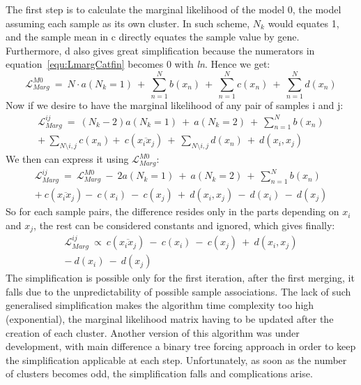 \documentclass[twocolumn]{article}
\begin{document}
The first step is to calculate the marginal likelihood of the model 0, the model assuming each sample as its own cluster. In such scheme, $N_k$ would equates 1, and the sample mean in c directly equates the sample value by gene. Furthermore, d also gives great simplification because the numerators in equation~\ref{equ:LmargCatfin} becomes 0 with \emph{ln}.
Hence we get:
\begin{equation}
    \mathcal{L}_{Marg}^{M0}\ =\ N\cdotp a(N_k=1)\ +\ \sum_{n=1}^Nb(x_n)\ +\ \sum_{n=1}^Nc(x_n)\ +\ \sum_{n=1}^Nd(x_n)
    \label{equ:M0}
\end{equation}
Now if we desire to have the marginal likelihood of any pair of samples i and j:
\begin{align}
    \mathcal{L}_{Marg}^{ij}\ =\ (N_k-2)a(N_k=1)\ +\ a(N_k=2)\ +\ \sum_{n=1}^Nb(x_n)\nonumber\\
    +\ \sum_{N\setminus{i,j}}c(x_n) +\  c(\overline{x_ix_j})\ +\ \sum_{N\setminus{i,j}}d(x_n)\ +\ d(x_i,x_j)
\end{align}
We then can express it using $\mathcal{L}_{Marg}^{M0}$:
\begin{align}
    \mathcal{L}_{Marg}^{ij}\ =\ \mathcal{L}_{Marg}^{M0}\ -\ 2a(N_k=1)\ +\ a(N_k=2)\ +\ \sum_{n=1}^Nb(x_n)\nonumber\\ +\ c(\overline{x_ix_j}) -\ c(x_i)\ -\ c(x_j)\ +\ d(x_i,x_j)\ -\ d(x_i)\ -\ d(x_j)
\end{align}
So for each sample pairs, the difference resides only in the parts depending on $x_i$ and $x_j$, the rest can be considered constants and ignored, which gives finally:
\begin{align}
    \mathcal{L}_{Marg}^{ij}\ \propto\ c(\overline{x_ix_j})\ -\ c(x_i)\ -\ c(x_j)\ +\ d(x_i,x_j)\nonumber\\ -\ d(x_i)\ -\ d(x_j)
    \label{equ:simplifMath}
\end{align}
The simplification is possible only for the first iteration, after the first merging, it falls due to the unpredictability of possible sample associations.
The lack of such generalised simplification makes the algorithm time complexity too high (exponential), the marginal likelihood matrix having to be updated after the creation of each cluster.
Another version of this algorithm was under development, with main difference a binary tree forcing approach in order to keep the simplification applicable at each step.
Unfortunately, as soon as the number of clusters becomes odd, the simplification falls and complications arise.
\end{document}
